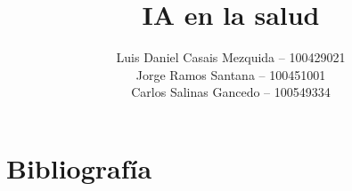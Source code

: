 \documentclass[es]{uc3mreport}
\author{
  Luis Daniel Casais Mezquida -- 100429021\\
  Jorge Ramos Santana -- 100451001\\
  Carlos Salinas Gancedo -- 100549334
}
\title{IA en la salud}
\begin{document}
  \makecover[old]


  \begin{report}


  \end{report}


   \label{bibliography}
   \part{Bibliografía}
   \printbibliography
   \printbibliography[heading=none]  %

\end{document}
